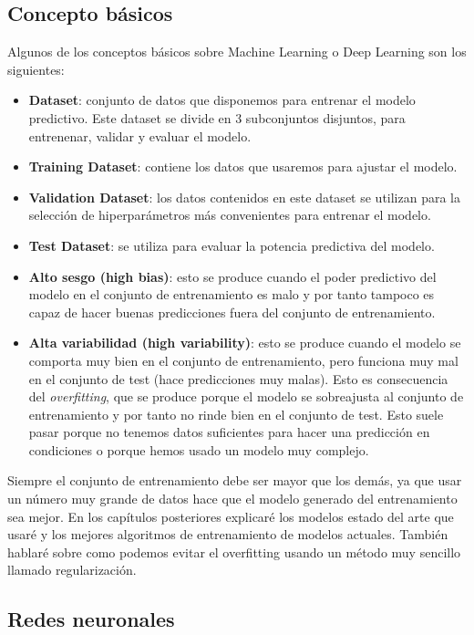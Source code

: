 \subsection{Concepto básicos}

Algunos de los conceptos básicos sobre Machine Learning o Deep Learning son los siguientes:

\begin{itemize}
	\item \textbf{Dataset}: conjunto de datos que disponemos para entrenar el modelo predictivo. Este dataset se divide en 3 subconjuntos disjuntos, para entrenenar, validar y evaluar el modelo.
	\item \textbf{Training Dataset}: contiene los datos que usaremos para ajustar el modelo.
	\item \textbf{Validation Dataset}: los datos contenidos en este dataset se utilizan para la selección de hiperparámetros más convenientes para entrenar el modelo.
	\item \textbf{Test Dataset}: se utiliza para evaluar la potencia predictiva del modelo.
	\item \textbf{Alto sesgo (high bias)}: esto se produce cuando el poder predictivo del modelo en el conjunto de entrenamiento es malo y por tanto tampoco es capaz de hacer buenas predicciones fuera del conjunto de entrenamiento.
	\item \textbf{Alta variabilidad (high variability)}: esto se produce cuando el modelo se comporta muy bien en el conjunto de entrenamiento, pero funciona muy mal en el conjunto de test (hace predicciones muy malas). Esto es consecuencia del \textit{overfitting}, que se produce porque el modelo se sobreajusta al conjunto de entrenamiento y por tanto no rinde bien en el conjunto de test. Esto suele pasar porque no tenemos datos suficientes para hacer una predicción en condiciones o porque hemos usado un modelo muy complejo.
\end{itemize}

Siempre el conjunto de entrenamiento debe ser mayor que los demás, ya que usar un número muy grande de datos hace que el modelo generado del entrenamiento sea mejor. En los capítulos posteriores explicaré los modelos estado del arte que usaré y los mejores algoritmos de entrenamiento de modelos actuales. También hablaré sobre como podemos evitar el overfitting usando un método muy sencillo llamado regularización.

\subsection{Redes neuronales}

